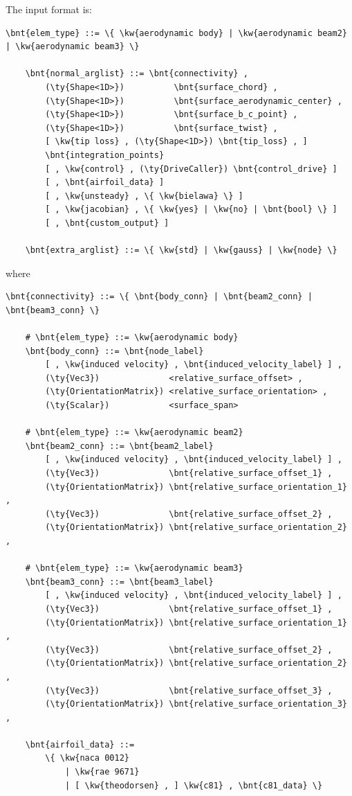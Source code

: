 The input format is:
\begin{Verbatim}[commandchars=\\\{\}]
    \bnt{elem_type} ::= \{ \kw{aerodynamic body} | \kw{aerodynamic beam2} | \kw{aerodynamic beam3} \}

    \bnt{normal_arglist} ::= \bnt{connectivity} ,
        (\ty{Shape<1D>})          \bnt{surface_chord} ,
        (\ty{Shape<1D>})          \bnt{surface_aerodynamic_center} ,
        (\ty{Shape<1D>})          \bnt{surface_b_c_point} ,
        (\ty{Shape<1D>})          \bnt{surface_twist} ,
        [ \kw{tip loss} , (\ty{Shape<1D>}) \bnt{tip_loss} , ]
        \bnt{integration_points}
        [ , \kw{control} , (\ty{DriveCaller}) \bnt{control_drive} ] 
        [ , \bnt{airfoil_data} ]
        [ , \kw{unsteady} , \{ \kw{bielawa} \} ]
        [ , \kw{jacobian} , \{ \kw{yes} | \kw{no} | \bnt{bool} \} ]
        [ , \bnt{custom_output} ]

    \bnt{extra_arglist} ::= \{ \kw{std} | \kw{gauss} | \kw{node} \}
\end{Verbatim}
where
\begin{Verbatim}[commandchars=\\\{\}]
    \bnt{connectivity} ::= \{ \bnt{body_conn} | \bnt{beam2_conn} | \bnt{beam3_conn} \}

    # \bnt{elem_type} ::= \kw{aerodynamic body}
    \bnt{body_conn} ::= \bnt{node_label}
        [ , \kw{induced velocity} , \bnt{induced_velocity_label} ] ,
        (\ty{Vec3})              <relative_surface_offset> , 
        (\ty{OrientationMatrix}) <relative_surface_orientation> ,
        (\ty{Scalar})            <surface_span>

    # \bnt{elem_type} ::= \kw{aerodynamic beam2}
    \bnt{beam2_conn} ::= \bnt{beam2_label}
        [ , \kw{induced velocity} , \bnt{induced_velocity_label} ] ,
        (\ty{Vec3})              \bnt{relative_surface_offset_1} ,
        (\ty{OrientationMatrix}) \bnt{relative_surface_orientation_1} ,
        (\ty{Vec3})              \bnt{relative_surface_offset_2} ,
        (\ty{OrientationMatrix}) \bnt{relative_surface_orientation_2} ,

    # \bnt{elem_type} ::= \kw{aerodynamic beam3}
    \bnt{beam3_conn} ::= \bnt{beam3_label} 
        [ , \kw{induced velocity} , \bnt{induced_velocity_label} ] ,
        (\ty{Vec3})              \bnt{relative_surface_offset_1} ,
        (\ty{OrientationMatrix}) \bnt{relative_surface_orientation_1} ,
        (\ty{Vec3})              \bnt{relative_surface_offset_2} ,
        (\ty{OrientationMatrix}) \bnt{relative_surface_orientation_2} ,
        (\ty{Vec3})              \bnt{relative_surface_offset_3} ,       
        (\ty{OrientationMatrix}) \bnt{relative_surface_orientation_3} ,

    \bnt{airfoil_data} ::=
        \{ \kw{naca 0012}
            | \kw{rae 9671}
            | [ \kw{theodorsen} , ] \kw{c81} , \bnt{c81_data} \}
\end{Verbatim}
